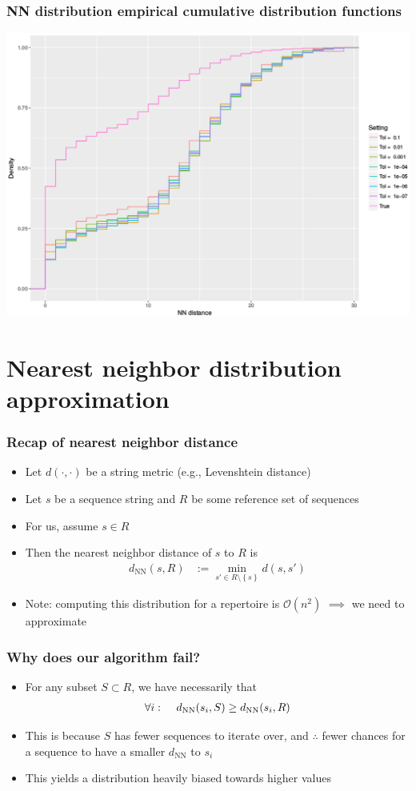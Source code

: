 \documentclass[mathserif,compress]{beamer}
\newcommand*\htab{\hspace{4 mm}}
\newcommand*\ba{\[ \begin{aligned}}
\newcommand*\ea{\end{aligned} \]}
\newcommand*\set[1]{\left\{#1\right\}}
\renewcommand\;{\,}
\begin{document}
\begin{frame}\frametitle{NN distribution empirical cumulative distribution functions}
\begin{center}
\includegraphics[width=\linewidth]{Images/ecdf_nn.png}
\end{center}
\end{frame}

\section{Nearest neighbor distribution approximation}

\begin{frame}\frametitle{Recap of nearest neighbor distance}
\begin{itemize}
\item[]
Let $d(\cdot, \cdot)$ be a string metric (e.g., Levenshtein distance)
\bigskip
\item[]
Let $s$ be a sequence string and $R$ be some reference set of sequences
\bigskip
\item[]
For us, assume $s \in R$
\bigskip
\item[]
Then the nearest neighbor distance of $s$ to $R$ is
\ba
d_\text{NN}(s, R)
	& := \min_{s' \in R \setminus \set{s}}
		d(s, s')
\ea
\item[]
Note: computing this distribution for a repertoire is $\mathcal O(n^2)$ $\implies$ we need to approximate
\end{itemize}
\end{frame}

\begin{frame}\frametitle{Why does our algorithm fail?}
\begin{itemize}
\item
For any subset $S \subset R$, we have necessarily that
\ba
\forall i: \htab d_\text{NN}(s_i, S) \ge d_\text{NN}(s_i, R)
\ea
\smallskip
\item
This is because $S$ has fewer sequences to iterate over, and $\therefore$ fewer chances for a sequence to have a smaller $d_\text{NN}$ to $s_i$
\bigskip
\item
This yields a distribution heavily biased towards higher values
\end{itemize}
\end{frame}
\end{document}

